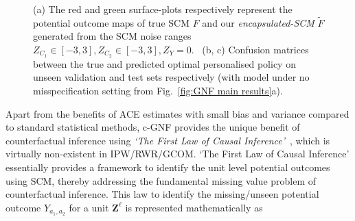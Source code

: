 \documentclass[letterpaper]{article} %
\begin{document}
\begin{figure}[ht!]
    \caption{
    (a) The red and green surface-plots respectively represent the potential outcome maps of true SCM $F$ and our \emph{encapsulated-SCM} $\tilde{F}$ generated from the SCM noise ranges $Z_{C_1}{ \in }[-3,3], Z_{C_2}{ \in }[-3,3], Z_Y{ = }0$.%
    ~(b, c) Confusion matrices between the true and predicted optimal personalised policy on unseen validation and test sets respectively (with model under no misspecification setting from Fig.~\ref{fig:GNF main results}a).
    }
    \label{fig:first law of causal inference}
\end{figure}
Apart from the benefits of ACE estimates with small bias and variance compared to standard statistical methods, c-GNF provides the unique benefit of counterfactual inference using \emph{`The First Law of Causal Inference'}~\cite{pearl2009abductionactionprediction, pearl2009causality, pearl2018bookofwhy}, which is virtually non-existent in IPW/RWR/GCOM. `The First Law of Causal Inference' essentially provides a framework to identify the unit level potential outcomes using SCM, thereby addressing the fundamental missing value problem of counterfactual inference. This law to identify the missing/unseen potential outcome $Y_{a_1,a_2}$ for a unit $\mathbf{Z^\ell}$ is represented mathematically as
\end{document}
